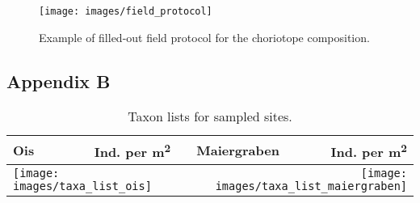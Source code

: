   \begin{figure}[!h]                                                       %
      \texttt{[image: images/field\_protocol]}           %
      \caption{Example of filled-out field protocol for the choriotope composition.}              %
      \label{fig:field_protocol}                                            %
  \end{figure}

  \newpage                                                                %



  \subsection*{Appendix B}\label{appendixB}                     %


    \renewcommand\thetable{B.\arabic{table}}                          %
    \setcounter{table}{0}                                              %


  \begin{table}[h!]                                                             %

  \caption{Taxon lists for sampled sites.}                                      %
     \begin{tabular}{ l r p{} l r }
     \toprule
     {   Ois}            &   {\scriptsize Ind. per m\textsuperscript{2}}  &   &
     {   Maiergraben}    &   {\scriptsize Ind. per m\textsuperscript{2}}    \\
     \hline
     \hline
     \multicolumn{2}{l}{\texttt{[image: images/taxa\_list\_ois]}}
       & &
     \multicolumn{2}{r}{\texttt{[image: images/taxa\_list\_maiergraben]}} \\
      \end{tabular}
      \label{tbl:taxa_list}

  \end{table}

  \newpage                                                                %
